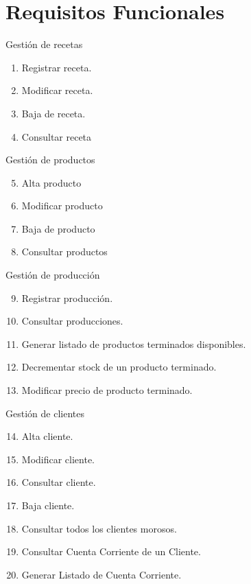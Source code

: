 \documentclass[letterpaper,10pt,english]{sphinxmanual}
\begin{document}
\section{Requisitos Funcionales}
\label{proyecto:requisitos-funcionales}
Gestión de recetas
\begin{enumerate}
\item {} 
Registrar receta.

\item {} 
Modificar receta.

\item {} 
Baja de receta.

\item {} 
Consultar receta

\end{enumerate}

Gestión de productos
\begin{enumerate}
\setcounter{enumi}{4}
\item {} 
Alta producto

\item {} 
Modificar producto

\item {} 
Baja de producto

\item {} 
Consultar productos

\end{enumerate}

Gestión de producción
\begin{enumerate}
\setcounter{enumi}{8}
\item {} 
Registrar producción.

\item {} 
Consultar producciones.

\item {} 
Generar listado de productos terminados disponibles.

\item {} 
Decrementar stock de un producto terminado.

\item {} 
Modificar precio de producto terminado.

\end{enumerate}

Gestión de clientes
\begin{enumerate}
\setcounter{enumi}{13}
\item {} 
Alta cliente.

\item {} 
Modificar cliente.

\item {} 
Consultar cliente.

\item {} 
Baja cliente.

\item {} 
Consultar todos los clientes morosos.

\item {} 
Consultar Cuenta Corriente de un Cliente.

\item {} 
Generar Listado de Cuenta Corriente.

\end{enumerate}
\end{document}
